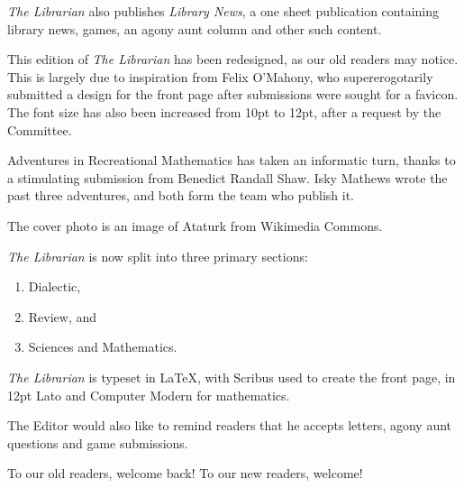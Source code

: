 \textit{The Librarian} also publishes \textit{Library News}, a one sheet publication containing library news, games, an agony aunt column and other such content.

This edition of \textit{The Librarian} has been redesigned, as our old readers may notice. This is largely due to inspiration from Felix O'Mahony, who supererogotarily submitted a design for the front page after submissions were sought for a favicon. The font size has also been increased from 10pt to 12pt, after a request by the Committee.

Adventures in Recreational Mathematics has taken an informatic turn, thanks to a stimulating submission from Benedict Randall Shaw. Isky Mathews wrote the past three adventures, and both form the team who publish it.

The cover photo is an image of Ataturk from Wikimedia Commons.

\textit{The Librarian} is now split into three primary sections:
\begin{enumerate}
	\item Dialectic,
	\item Review, and
	\item Sciences and Mathematics.
\end{enumerate}

\textit{The Librarian} is typeset in \LaTeX, with Scribus used to create the front page, in 12pt Lato and Computer Modern for mathematics.

The Editor would also like to remind readers that he accepts letters, agony aunt questions and game submissions.

To our old readers, welcome back! To our new readers, welcome!
